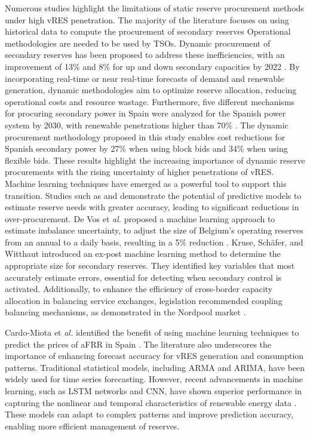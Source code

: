 Numerous studies highlight the limitations of static reserve procurement methods under high vRES penetration.
%
The majority of the literature focuses on using historical data to compute the procurement of secondary reserves \cite{Knorr:19,Frade2019_market,Papavasiliou:21}
%
Operational methodologies are needed to be used by TSOs.
%
Dynamic procurement of secondary reserves has been proposed to address these inefficiencies, with an improvement of 13\% and 8\% for up and down secondary capacities by 2022 \cite{Algarvio2024}. By incorporating real-time or near real-time forecasts of demand and renewable generation, dynamic methodologies aim to optimize reserve allocation, reducing operational costs and resource wastage.
%
Furthermore, five different mechanisms for procuring secondary power in Spain were analyzed for the Spanish power system by 2030, with renewable penetrations higher than 70\% \cite{Algarvio:24}. The dynamic procurement methodology proposed in this study enables cost reductions for Spanish secondary power by 27\% when using block bids and 34\% when using flexible bids. These results highlight the increasing importance of dynamic reserve procurements with the rising uncertainty of higher penetrations of \gls{vRES}.  
%
Machine learning techniques have emerged as a powerful tool to support this transition. Studies such as \cite{DeVos2019} and \cite{Kruse2022} demonstrate the potential of predictive models to estimate reserve needs with greater accuracy, leading to significant reductions in over-procurement. 
De Vos et \textit{al.} proposed a machine learning approach to estimate imbalance uncertainty, to adjust the size of Belgium's operating reserves from an annual to a daily basis, resulting in a 5\% reduction \cite{DeVos2019}. Kruse, Sch\"{a}fer, and Witthaut introduced an ex-post machine learning method to determine the appropriate size for secondary reserves. They identified key variables that most accurately estimate errors, essential for detecting when secondary control is activated. Additionally, to enhance the efficiency of cross-border capacity allocation in balancing service exchanges, legislation recommended coupling balancing mechanisms, as demonstrated in the Nordpool market \cite{Frade:19c,Khodadadi:20}.\par
Cardo-Miota et \textit{al.} identified the benefit of using machine learning techniques to predict the prices of \gls{aFRR} in Spain \cite{Cardo-Miota:23}.
The literature also underscores the importance of enhancing forecast accuracy for \gls{vRES} generation and consumption patterns. Traditional statistical models, including ARMA and ARIMA, have been widely used for time series forecasting. However, recent advancements in machine learning, such as \gls{LSTM} networks and \gls{CNN}, have shown superior performance in capturing the nonlinear and temporal characteristics of renewable energy data \cite{Couto:21,Benti2023}. These models can adapt to complex patterns and improve prediction accuracy, enabling more efficient management of reserves.\par

